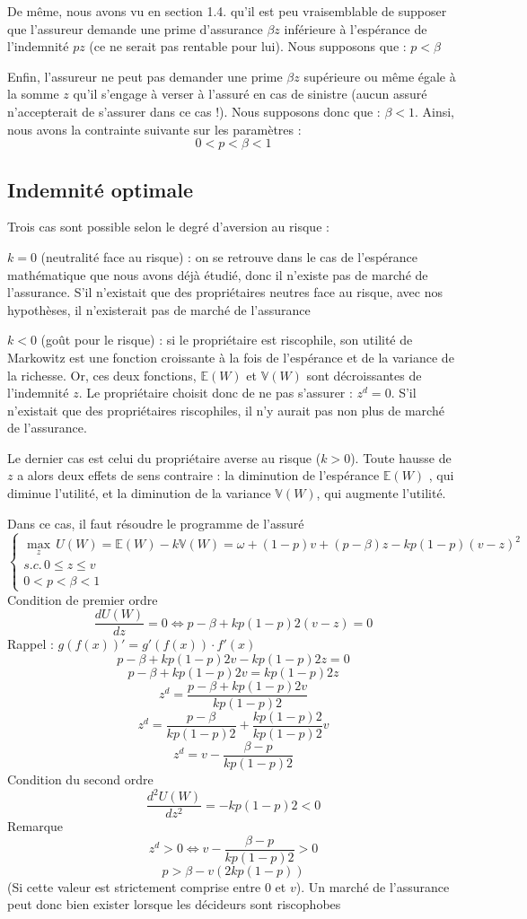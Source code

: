 \documentclass[a4paper, 12pt]{report}
\begin{document}
De même, nous avons vu en section 1.4. qu'il est peu vraisemblable de supposer que l'assureur demande une prime d'assurance $\beta z$ inférieure à l'espérance de l'indemnité $pz$ (ce ne serait pas rentable pour lui). Nous supposons que : $p<\beta$

Enfin, l'assureur ne peut pas demander une prime $\beta z$ supérieure ou même égale à la somme $z$ qu'il s'engage à verser à l'assuré en cas de sinistre (aucun assuré n'accepterait de s'assurer dans ce cas !). Nous supposons donc que : $\beta<1$. Ainsi, nous avons la contrainte suivante sur les paramètres :
$$
0<p<\beta<1
$$

\subsection{Indemnité optimale}

Trois cas sont possible selon le degré d'aversion au risque :

$k=0$ (neutralité face au risque) : on se retrouve dans le cas de l'espérance mathématique que nous avons déjà étudié, donc il n'existe pas de marché de l'assurance. S'il n'existait que des propriétaires neutres face au risque, avec nos hypothèses, il n'existerait pas de marché de l'assurance

$k<0$ (goût pour le risque) : si le propriétaire est riscophile, son utilité de Markowitz est une fonction croissante à la fois de l'espérance et de la variance de la richesse. Or, ces deux fonctions, $\mathbb{E}(W)$ et $\mathbb{V}(W)$ sont décroissantes de l'indemnité $z$. Le propriétaire choisit donc de ne pas s'assurer : $z^d=0$. S'il n'existait que des propriétaires riscophiles, il n'y aurait pas non plus de marché de l'assurance. 

Le dernier cas est celui du propriétaire averse au risque ($k>0$). Toute hausse de $z$ a alors deux effets de sens contraire : la diminution de l'espérance $\mathbb{E}(W)$ , qui diminue l'utilité, et la diminution de la variance $\mathbb{V}(W)$, qui augmente l'utilité.

Dans ce cas, il faut résoudre le programme de l'assuré
$$
\begin{cases}\underset{z}\max \,U(W)=\mathbb{E}(W)-k\mathbb{V}(W)=\omega+(1-p)v+(p-\beta)z-kp(1-p)(v-z)^2\\ s.c. \, 0\le z\le v \\ 0 < p < \beta < 1 \end{cases}
$$
Condition de premier ordre
$$
\frac{d U(W)}{dz}=0\Leftrightarrow p-\beta+kp(1-p)2(v-z)=0
$$
Rappel : $g(f(x))'=g'(f(x))\cdot f'(x)$
$$
p-\beta + kp(1-p)2v-kp(1-p)2z=0
$$
$$
p-\beta + kp(1-p)2v=kp(1-p)2z
$$
$$
z^d=\frac{p-\beta + kp(1-p)2v}{kp(1-p)2}
$$
$$
z^d=\frac{p-\beta }{kp(1-p)2}+\frac{kp(1-p)2}{kp(1-p)2}v
$$
$$
z^d=v-\frac{\beta-p}{kp(1-p)2}
$$
Condition du second ordre 
$$
\frac{d^2U(W)}{dz^2}=-kp(1-p)2<0
$$
Remarque 
$$
z^d>0 \Leftrightarrow  v -\frac{\beta - p }{kp(1-p)2}>0
$$
$$
p>\beta - v(2kp(1-p))
$$
(Si cette valeur est strictement comprise entre 0 et $v$). Un marché de l'assurance peut donc bien exister lorsque les décideurs sont riscophobes
\end{document}
